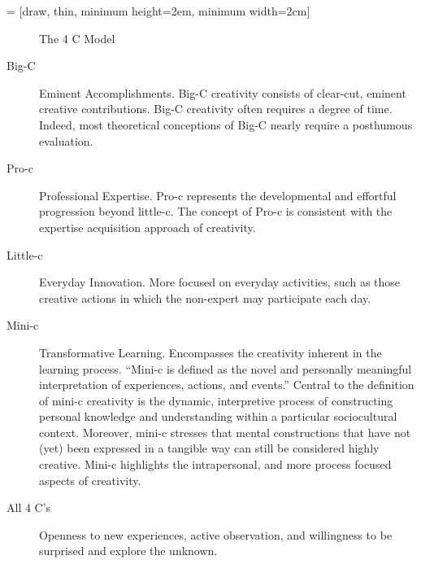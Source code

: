  = [draw, thin, minimum height=2em, minimum width=2cm]
\begin{figure}[!htbp]
  \centering
\caption[The 4 C Model]{The 4 C Model}
\label{fig:4C}
\end{figure}

\begin{description}
  \item [Big-C] Eminent Accomplishments. Big-C creativity consists of clear-cut, eminent creative contributions. Big-C creativity often requires a degree of time. Indeed, most theoretical conceptions of Big-C nearly require a posthumous evaluation.
  \item [Pro-c] Professional Expertise. Pro-c represents the developmental and effortful progression beyond little-c. The concept of Pro-c is consistent with the expertise acquisition approach of creativity.
  \item [Little-c] Everyday Innovation. More focused on everyday activities, such as those creative actions in which the non-expert may participate each day.
  \item [Mini-c] Transformative Learning. Encompasses the creativity inherent in the learning process. ``Mini-c is defined as the novel and personally meaningful interpretation of experiences, actions, and events.'' \autocite{Beghetto2007} Central to the definition of mini-c creativity is the dynamic, interpretive process of constructing personal knowledge and understanding within a particular sociocultural context. Moreover, mini-c stresses that mental constructions that have not (yet) been expressed in a tangible way can still be considered highly creative. Mini-c highlights the intrapersonal, and more process focused aspects of creativity.
  \item [All 4 C's] Openness to new experiences, active observation, and willingness to be surprised and explore the unknown.
\end{description}


